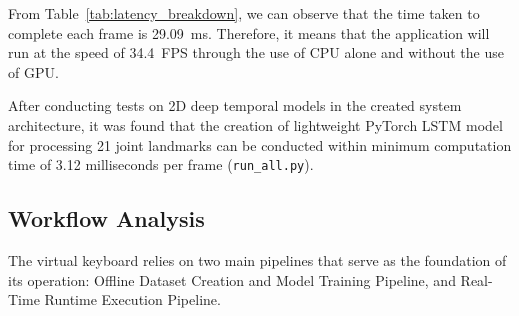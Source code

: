 \begin{table}[htbp]
\centering
\caption{Runtime execution latency breakdown per frame on standard CPU hardware.}
\label{tab:latency_breakdown}
\end{table}

From Table~\ref{tab:latency_breakdown}, we can observe that the time taken to complete each frame is 29.09~ms. Therefore, it means that the application will run at the speed of 34.4~FPS through the use of CPU alone and without the use of GPU.

After conducting tests on 2D deep temporal models in the created system architecture, it was found that the creation of lightweight PyTorch LSTM model for processing 21 joint landmarks can be conducted within minimum computation time of 3.12 milliseconds per frame (\texttt{run\_all.py}).

\subsection{Workflow Analysis}
\label{subsec:lit_workflow_analysis}
The virtual keyboard relies on two main pipelines that serve as the foundation of its operation: Offline Dataset Creation and Model Training Pipeline, and Real-Time Runtime Execution Pipeline.

